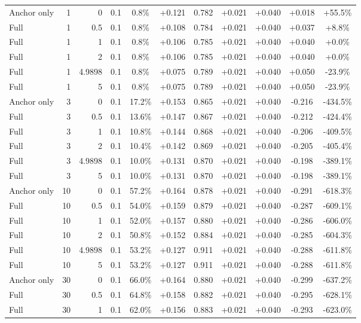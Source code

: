 \begin{table}[htbp]
\begin{tabular}{lrrrccccccc}
Anchor only & 1 & 0 & 0.1 & 0.8\% & +0.121 & 0.782 & +0.021 & +0.040 & +0.018 & +55.5\% \\
Full & 1 & 0.5 & 0.1 & 0.8\% & +0.108 & 0.784 & +0.021 & +0.040 & +0.037 & +8.8\% \\
Full & 1 & 1 & 0.1 & 0.8\% & +0.106 & 0.785 & +0.021 & +0.040 & +0.040 & +0.0\% \\
Full & 1 & 2 & 0.1 & 0.8\% & +0.106 & 0.785 & +0.021 & +0.040 & +0.040 & +0.0\% \\
Full & 1 & 4.9898 & 0.1 & 0.8\% & +0.075 & 0.789 & +0.021 & +0.040 & +0.050 & -23.9\% \\
Full & 1 & 5 & 0.1 & 0.8\% & +0.075 & 0.789 & +0.021 & +0.040 & +0.050 & -23.9\% \\
Anchor only & 3 & 0 & 0.1 & 17.2\% & +0.153 & 0.865 & +0.021 & +0.040 & -0.216 & -434.5\% \\
Full & 3 & 0.5 & 0.1 & 13.6\% & +0.147 & 0.867 & +0.021 & +0.040 & -0.212 & -424.4\% \\
Full & 3 & 1 & 0.1 & 10.8\% & +0.144 & 0.868 & +0.021 & +0.040 & -0.206 & -409.5\% \\
Full & 3 & 2 & 0.1 & 10.4\% & +0.142 & 0.869 & +0.021 & +0.040 & -0.205 & -405.4\% \\
Full & 3 & 4.9898 & 0.1 & 10.0\% & +0.131 & 0.870 & +0.021 & +0.040 & -0.198 & -389.1\% \\
Full & 3 & 5 & 0.1 & 10.0\% & +0.131 & 0.870 & +0.021 & +0.040 & -0.198 & -389.1\% \\
Anchor only & 10 & 0 & 0.1 & 57.2\% & +0.164 & 0.878 & +0.021 & +0.040 & -0.291 & -618.3\% \\
Full & 10 & 0.5 & 0.1 & 54.0\% & +0.159 & 0.879 & +0.021 & +0.040 & -0.287 & -609.1\% \\
Full & 10 & 1 & 0.1 & 52.0\% & +0.157 & 0.880 & +0.021 & +0.040 & -0.286 & -606.0\% \\
Full & 10 & 2 & 0.1 & 50.8\% & +0.152 & 0.884 & +0.021 & +0.040 & -0.285 & -604.3\% \\
Full & 10 & 4.9898 & 0.1 & 53.2\% & +0.127 & 0.911 & +0.021 & +0.040 & -0.288 & -611.8\% \\
Full & 10 & 5 & 0.1 & 53.2\% & +0.127 & 0.911 & +0.021 & +0.040 & -0.288 & -611.8\% \\
Anchor only & 30 & 0 & 0.1 & 66.0\% & +0.164 & 0.880 & +0.021 & +0.040 & -0.299 & -637.2\% \\
Full & 30 & 0.5 & 0.1 & 64.8\% & +0.158 & 0.882 & +0.021 & +0.040 & -0.295 & -628.1\% \\
Full & 30 & 1 & 0.1 & 62.0\% & +0.156 & 0.883 & +0.021 & +0.040 & -0.293 & -623.0\% \\

\end{tabular}
\end{table}
